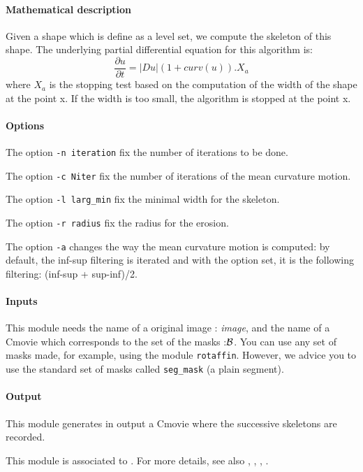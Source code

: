 
\paragraph{Mathematical description} \mbox{}

Given a shape which is define as a level set,
we compute the skeleton of this shape.
The underlying partial differential equation for this
algorithm is:
$$ \frac{\partial u}{\partial t} = |Du| (1+curv(u)).X_a$$
where $X_a$ is the stopping test based on the computation
of the width of the shape at the point x. If the width is too small,
the algorithm is stopped at the point x.

\paragraph{Options } \mbox{}

The option \verb+-n iteration+ fix the number of iterations to be done. 

The option \verb+-c Niter+ fix the number of iterations of the 
mean curvature motion. 

The option \verb+-l larg_min+ fix the minimal width for the skeleton.

The option \verb+-r radius+ fix the radius for the erosion.

The option \verb+-a+ changes the way the mean curvature motion is
computed: by default, the inf-sup filtering is iterated and 
with the option set, it is the following filtering:
(inf-sup + sup-inf)/2.

\paragraph{Inputs} \mbox{}

This module needs the name of a original image : {\it image}, and the
name of a Cmovie which corresponds to the set of the masks :${\cal B}$. 
You can use any set of masks made, for example, using the module 
\verb+rotaffin+.
However, we advice you to use the standard set of masks called 
\verb+seg_mask+ (a plain segment).

\paragraph{Output} \mbox{}

This module generates in output a Cmovie where the successive skeletons 
are recorded.

\vskip 1cm
 
This module is associated to \cite{pasquignon:skeleton}. For more
details, see also \cite{catte.dibos:morphomcm}, 
\cite{catte.dibos.koepfler:mcmscheme}, \cite{catte:conv}, \cite{guichard:phd}.














